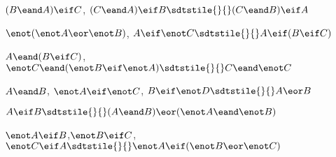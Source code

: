 \begin{exercises}
\item $(B\eand A)\eif C$, $(C\eand A)\eif B\sdtstile{}{}(C\eand B)\eif A$ %



\item $\enot (\enot A \eor \enot B)$, $A \eif \enot C \sdtstile{}{} A \eif (B \eif C)$ %



\item $A \eand (B \eif C)$, $\enot C \eand (\enot B \eif \enot A)\sdtstile{}{}C \eand \enot C$ %



\item $A \eand B$, $\enot A \eif \enot C$, $B \eif \enot D \sdtstile{}{} A \eor B$ %



\item $A \eif B\sdtstile{}{}(A \eand B) \eor (\enot A \eand \enot B)$ %



\item $\enot A \eif B$,$ \enot B \eif C $,$ \enot C \eif A \sdtstile{}{} \enot A \eif (\enot B \eor \enot C) $%



\end{exercises}

